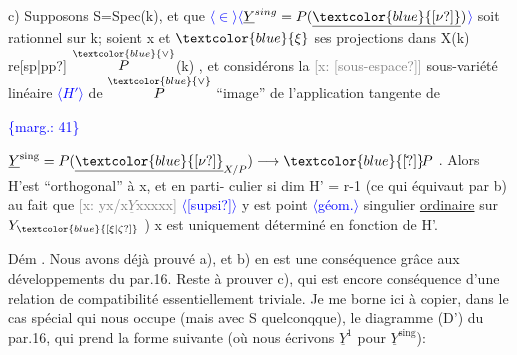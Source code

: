 \documentclass[11pt]{article}
\newcommand{\scanpage}[1]{\par\bigskip\noindent{\small\sffamily[scan #1]}\par}
\newcommand{\mspage}[1]{{\small\sffamily[p.\,#1]}}
\newcommand{\hand}[1]{\textcolor{blue}{#1}}
\let\over\relax
\newcommand{\over}[2]{\textcolor{gray}{#1}\textcolor{blue}{\ensuremath{^{\!\nearrow}}#2}}
\newcommand{\inserted}[2][]{\textcolor{blue}{$\langle$#2$\rangle$}}
\newcommand{\margin}[1]{\textcolor{blue}{\{\textsf{marg.:} #1\}}}
\newcommand{\xout}[1]{\textcolor{gray}{[\textsf{x:} #1]}}
\newcommand{\uline}[1]{\underline{#1}}
\newcommand{\unsure}[1]{[#1?]}
\newcommand{\illegible}[1]{[\textsf{illeg.\ #1}]}
\newenvironment{diagramblock}{\par\begin{center}}{\end{center}\par}
\begin{document}
c) Supposons S=Spec(k), et que \over{\illegible{1}}{$y$} \inserted{$\in$}\inserted[typed]{$\underline{Y}^{sing} = P(\underline{\hand{\unsure{\nu}}})$} soit rationnel sur k; soient x
et $\hand{\xi}$ ses projections dans X(k) re\unsure{sp|pp} $\overset{\hand{\vee}}{P}$(k) , et considérons la \xout{\unsure{sous-espace}}
sous-variété linéaire \inserted{$H'$} de $\overset{\hand{\vee}}{P}$ ``image'' de l'application tangente de

\margin{41}

\clearpage
\scanpage{25/42}
\mspage{\hand{38}}

$\underline{Y}^{\mathrm{sing}} = P(\underline{\hand{\unsure{\nu}}}_{X/P}) \longrightarrow \hand{\unsure{\check{}}}\!P$ . Alors H'est ``orthogonal'' à x, et en parti-%
culier si dim H' = r-1 (ce qui équivaut par b) au fait que \xout{yx/x$\underline{Y}$xxxxx} \inserted[typed]{\unsure{supsi}}
y est point \inserted{géom.} singulier \uline{ordinaire} sur $Y_{\hand{\unsure{\xi|\zeta}}}$ ) x est uniquement déterminé
en fonction de H'.

Dém . Nous avons déjà prouvé a), et b) en est une conséquence
grâce aux développements du par.16. Reste à prouver c), qui est
encore conséquence d'une relation de compatibilité essentiellement
triviale. Je me borne ici à copier, dans le cas spécial qui nous
occupe (mais avec S quelconqque), le diagramme (D') du par.16, qui
prend la forme suivante (où nous écrivons $\underline{Y}^1$ pour $\underline{Y}^{\mathrm{sing}}$):

\begin{diagramblock}
\end{diagramblock}
\end{document}
